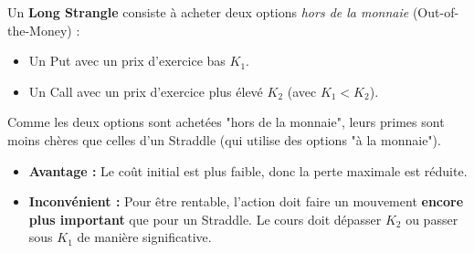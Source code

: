 \begin{definitionbox}
Un \textbf{Long Strangle} consiste à acheter deux options \textit{hors de la monnaie} (Out-of-the-Money) :
\begin{itemize}
    \item Un Put avec un prix d'exercice bas $K_1$.
    \item Un Call avec un prix d'exercice plus élevé $K_2$ (avec $K_1 < K_2$).
\end{itemize}
\end{definitionbox}

\begin{intuitionbox}
Comme les deux options sont achetées "hors de la monnaie", leurs primes sont moins chères que celles d'un Straddle (qui utilise des options "à la monnaie").
\begin{itemize}
    \item \textbf{Avantage :} Le coût initial est plus faible, donc la perte maximale est réduite.
    \item \textbf{Inconvénient :} Pour être rentable, l'action doit faire un mouvement \textbf{encore plus important} que pour un Straddle. Le cours doit dépasser $K_2$ ou passer sous $K_1$ de manière significative.
\end{itemize}
\end{intuitionbox}

\begin{center}
\end{center}